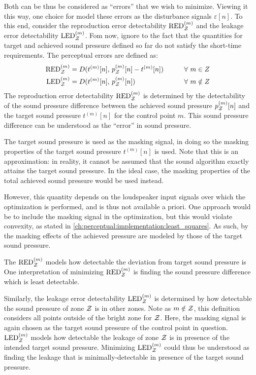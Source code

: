 Both can be thus be considered as ``errors'' that we wish to minimize.
Viewing it this way, one choice for model these errors as the disturbance signals $\varepsilon[n]$.
To this end, consider the reproduction error detectability $\text{RED}^{(m)}_{\mathcal{Z}}$ and the leakage error detectability $\text{LED}^{(m)}_{\mathcal{Z}}$.
Fom now, ignore to the fact that the quantities for target and achieved sound pressure defined so far do not satisfy the short-time requirements. 
The perceptual errors are defined as: 
\begin{alignat}{2}
    \text{RED}^{(m)}_{\mathcal{Z}} &= D(t^{(m)}[n],\,p_{\mathcal{Z}}^{(m)}[n] - t^{(m)}[n]) \qquad&& \forall\,\, m\in Z \label{eq:sound_zone:approach_selection:RED}\\
    \text{LED}^{(m)}_{\mathcal{Z}} &= D(t^{(m)}[n],\,p_{\mathcal{Z}}^{(m)}[n]) \qquad&& \forall\,\, m\notin Z \label{eq:sound_zone:approach_selection:LED} 
\end{alignat}
The reproduction error detectability $\text{RED}^{(m)}_{\mathcal{Z}}$ is determined by the detectability of the sound pressure difference between the achieved sound
pressure $p_{\mathcal{Z}}^{(m)}[n]$ and the target sound pressure $t^{(m)}[n]$ for the control point $m$.
This sound pressure difference can be understood as the ``error'' in sound pressure.

The target sound pressure is used as the masking signal, in doing so the masking properties of the target sound pressure $t^{(m)}[n]$ is used.
Note that this is an approximation: in reality, it cannot be assumed that the sound algorithm exactly attains the target sound pressure.
In the ideal case, the masking properties of the total achieved sound pressure would be used instead.

However, this quantity depends on the loudspeaker input signals over which the optimization is performed, and is thus not available a priori. 
One approach would be to include the masking signal in the optimization, but this would violate convexity, as stated in 
\autoref{ch:perceptual:implementation:least_squares}.
As such, by the masking effects of the achieved pressure are modeled by those of the target sound pressure.

The $\text{RED}^{(m)}_{\mathcal{Z}}$ models how detectable the deviation from target sound pressure is
One interpretation of minimizing $\text{RED}^{(m)}_{\mathcal{Z}}$ is finding the sound pressure difference which is least detectable. 

Similarly, the leakage error detectability $\text{LED}^{(m)}_{\mathcal{Z}}$ is determined by how detectable the sound pressure of zone $\mathcal{Z}$ is in other zones.
Note as $m\notin\mathcal{Z}$, this definition considers all points outside of the bright zone for $\mathcal{Z}$.  
Here, the masking signal is again chosen as the target sound pressure of the control point in question.
$\text{LED}^{(m)}_{\mathcal{Z}}$ models how detectable the leakage of zone $\mathcal{Z}$ is in presence of the intended target sound pressure. 
Minimizing $\text{LED}^{(m)}_{\mathcal{Z}}$ could thus be understood as finding the leakage that is minimally-detectable in presence of the target sound pressure.

